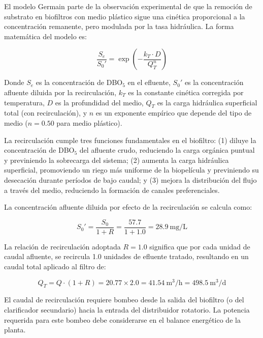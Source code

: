 \documentclass[12pt,a4paper]{article}
\begin{document}
El modelo Germain parte de la observación experimental de que la remoción de substrato en biofiltros con medio plástico sigue una cinética proporcional a la concentración remanente, pero modulada por la tasa hidráulica. La forma matemática del modelo es:

\begin{equation}
\frac{S_e}{S_0'} = \exp\!\left(-\frac{k_T \cdot D}{Q_T^n}\right)
\end{equation}

Donde $S_e$ es la concentración de DBO$_5$ en el efluente, $S_0'$ es la concentración afluente diluida por la recirculación, $k_T$ es la constante cinética corregida por temperatura, $D$ es la profundidad del medio, $Q_T$ es la carga hidráulica superficial total (con recirculación), y $n$ es un exponente empírico que depende del tipo de medio ($n = 0.50$ para medio plástico).

La recirculación cumple tres funciones fundamentales en el biofiltro: (1) diluye la concentración de DBO$_5$ del afluente crudo, reduciendo la carga orgánica puntual y previniendo la sobrecarga del sistema; (2) aumenta la carga hidráulica superficial, promoviendo un riego más uniforme de la biopelícula y previniendo su desecación durante períodos de bajo caudal; y (3) mejora la distribución del flujo a través del medio, reduciendo la formación de canales preferenciales.

La concentración afluente diluida por efecto de la recirculación se calcula como:

\begin{equation}
S_0' = \frac{S_0}{1 + R} = \frac{57.7}{1 + 1.0} = 28.9\ \text{mg/L}
\end{equation}

La relación de recirculación adoptada $R = 1.0$ significa que por cada unidad de caudal afluente, se recircula 1.0 unidades de efluente tratado, resultando en un caudal total aplicado al filtro de:

\begin{equation}
Q_T = Q \cdot (1 + R) = 20.77 \times 2.0 = 41.54\ \text{m}^3\text{/h} = 498.5\ \text{m}^3\text{/d}
\end{equation}

El caudal de recirculación requiere bombeo desde la salida del biofiltro (o del clarificador secundario) hacia la entrada del distribuidor rotatorio. La potencia requerida para este bombeo debe considerarse en el balance energético de la planta.
\end{document}
